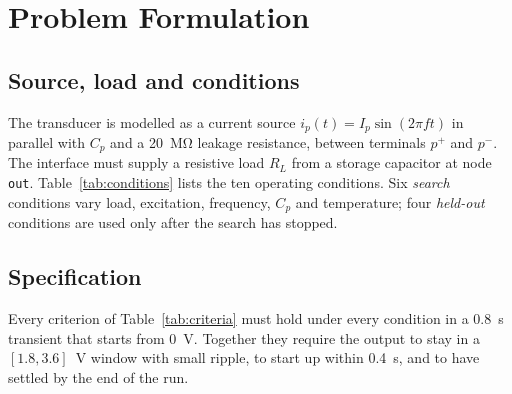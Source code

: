 \documentclass[journal]{IEEEtran}
\begin{document}
\section{Problem Formulation}\label{sec:problem}
\subsection{Source, load and conditions}
The transducer is modelled as a current source $i_p(t) = I_p\sin(2\pi f t)$ in parallel with $C_p$ and a
\SI{20}{\mega\ohm} leakage resistance, between terminals $p^+$ and $p^-$. The interface must supply a
resistive load $R_L$ from a storage capacitor at node \texttt{out}. Table~\ref{tab:conditions} lists the
ten operating conditions. Six \emph{search} conditions vary load, excitation, frequency, $C_p$ and
temperature; four \emph{held-out} conditions are used only after the search has stopped.

\begin{table}[t]
\centering\footnotesize
\caption{Operating conditions. Held-out conditions are never shown to the model nor used for scoring,
selection or stopping.}\label{tab:conditions}
\resizebox{\columnwidth}{!}{}
\end{table}

\subsection{Specification}
Every criterion of Table~\ref{tab:criteria} must hold under every condition in a \SI{0.8}{s} transient
that starts from \SI{0}{V}. Together they require the output to stay in a $[1.8, 3.6]$~V window with
small ripple, to start up within \SI{0.4}{s}, and to have settled by the end of the run.

\begin{table}[t]
\centering\footnotesize
\caption{Pass/fail criteria (all conditions).}\label{tab:criteria}
\resizebox{\columnwidth}{!}{}
\end{table}
\end{document}
